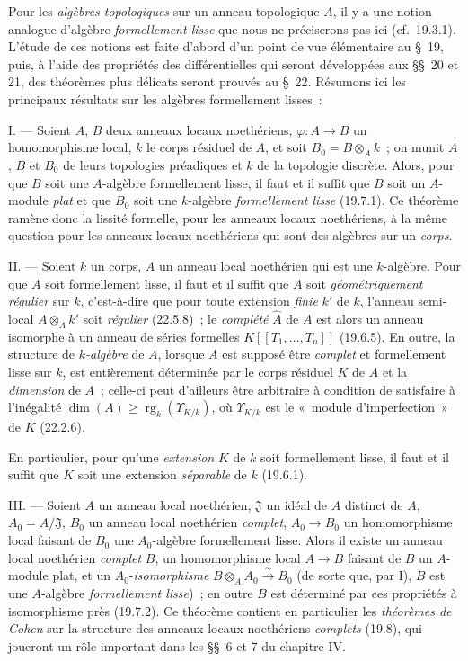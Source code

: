 \begin{env}[19.0.2]
\label{0.19.0.2-fr}
Pour les \emph{algèbres topologiques} sur un anneau topologique $A$, il y a une
notion analogue d'algèbre \emph{formellement lisse} que nous ne préciserons pas
ici (cf.~19.3.1). L'étude de ces notions est faite d'abord d'un point de vue
élémentaire au §~19, puis, à l'aide des propriétés des différentielles qui
seront développées aux §§~20 et 21, des théorèmes plus délicats seront prouvés
au §~22. Résumons ici les principaux résultats sur les algèbres formellement
lisses~:

\medskip\noindent I. --- Soient $A$, $B$ deux anneaux locaux
noethériens, $\varphi:A\to B$ un homomorphisme local, $k$ le corps résiduel de
$A$, et soit $B_0=B\otimes_A k$~; on munit $A$, $B$ et $B_0$ de leurs
topologies préadiques et $k$ de la topologie discrète. Alors, pour que $B$ soit
une $A$-algèbre formellement lisse, il faut et il suffit que $B$ soit un
$A$-module \emph{plat} et que $B_0$ soit une $k$-algèbre \emph{formellement
lisse} (19.7.1). Ce théorème ramène donc la lissité formelle, pour les anneaux
locaux noethériens, à la même question pour les anneaux locaux noethériens qui
sont des algèbres sur un \emph{corps}.

\medskip\noindent II. --- Soient $k$ un corps, $A$ un anneau local
noethérien qui est une $k$-algèbre. Pour que $A$ soit formellement lisse, il
faut et il suffit que $A$ soit \emph{géométriquement régulier} sur $k$,
c'est-à-dire que pour toute extension \emph{finie} $k'$ de $k$, l'anneau
semi-local $A\otimes_A k'$ soit
\emph{régulier} (22.5.8)~; le \emph{complété} $\widehat A$ de $A$ est alors
un anneau isomorphe à un anneau de séries formelles
$K[[T_1,\ldots,T_n]]$ (19.6.5). En outre, la structure de \emph{$k$-algèbre} de $A$,
lorsque $A$ est supposé être \emph{complet} et formellement lisse sur $k$, est
entièrement déterminée par le corps résiduel $K$ de $A$ et la \emph{dimension}
de $A$~; celle-ci peut d'ailleurs être arbitraire à condition de satisfaire à
l'inégalité
$\dim(A)\geq \operatorname{rg}_k(\Upsilon_{K/k})$,
où $\Upsilon_{K/k}$ est le «~module d'imperfection~» de $K$ (22.2.6).

En particulier, pour qu'une \emph{extension} $K$ de $k$ soit formellement
lisse, il faut et il suffit que $K$ soit une extension \emph{séparable} de $k$
(19.6.1).

\medskip\noindent III. --- Soient $A$ un anneau local noethérien,
$\mathfrak J$ un idéal de $A$ distinct de $A$, $A_0=A/\mathfrak J$, $B_0$ un
anneau local noethérien \emph{complet}, $A_0\to B_0$ un homomorphisme local
faisant de $B_0$ une $A_0$-algèbre formellement lisse. Alors il existe un
anneau local noethérien \emph{complet} $B$, un homomorphisme local $A\to B$
faisant de $B$ un $A$-module plat, et un $A_0$-\emph{isomorphisme}
$B\otimes_A A_0\xrightarrow{\sim}B_0$
(de sorte que, par I), $B$ est une $A$-algèbre \emph{formellement lisse})~; en
outre $B$ est déterminé par ces propriétés à isomorphisme près (19.7.2). Ce
théorème contient en particulier les \emph{théorèmes de Cohen} sur la structure
des anneaux locaux noethériens \emph{complets} (19.8), qui joueront un rôle
important dans les §§~6 et 7 du chapitre IV.


\end{env}
